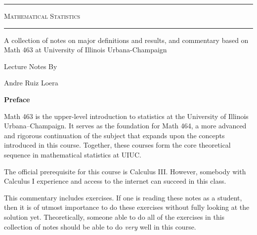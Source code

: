 \documentclass[11pt,letterpaper]{article}
\theoremstyle{remark}
\begin{document}
\thispagestyle{empty}
\vspace*{4cm}

\begin{center}
\noindent\rule{\textwidth}{3pt}

\vspace{2cm}

{\fontsize{40}{48}\selectfont \textsc{Mathematical Statistics}}

\vspace{2cm}

\noindent\rule{\textwidth}{3pt}

\vspace{3cm}

{\large A collection of notes on major definitions and results, and commentary based on Math 463 at University of Illinois Urbana-Champaign}

\vspace{3cm}

{\Large Lecture Notes By}

\vspace{0.8cm}

{\huge Andre Ruiz Loera}

\end{center}

\newpage

\thispagestyle{empty}
\vspace*{2cm}

\begin{center}
{\Large \textbf{Preface}}
\end{center}

\vspace{1.5cm}

Math 463 is the upper-level introduction to statistics at the University of Illinois Urbana--Champaign. It serves as the foundation for Math 464, a more advanced and rigorous continuation of the subject that expands upon the concepts introduced in this course. Together, these courses form the core theoretical sequence in mathematical statistics at UIUC.

The official prerequisite for this course is Calculus III. However, somebody with Calculus I experience and access to the internet can succeed in this class.

This commentary includes exercises. If one is reading these notes as a student, then it is of utmost importance to do these exercises without fully looking at the solution yet. Theoretically, someone able to do all of the exercises in this collection of notes should be able to do \textit{very} well in this course.
\end{document}
